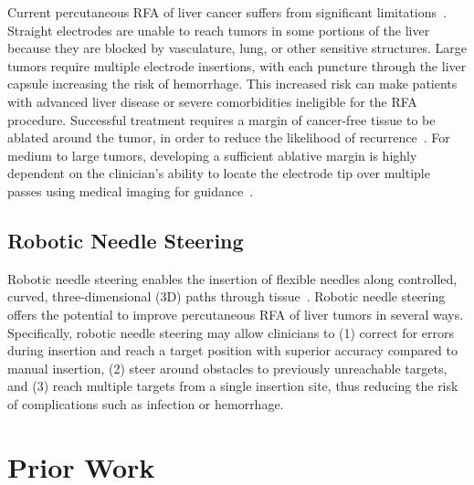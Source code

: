 Current percutaneous RFA of liver cancer suffers from significant limitations~\cite{Gervais2009}. Straight electrodes are unable to reach tumors in some portions of the liver because they are blocked by vasculature, lung, or other sensitive structures. Large tumors require multiple electrode insertions, with each puncture through the liver capsule increasing the risk of hemorrhage. This increased risk can make patients with advanced liver disease or severe comorbidities ineligible for the RFA procedure. Successful treatment requires a margin of cancer-free tissue to be ablated around the tumor, in order to reduce the likelihood of recurrence~\cite{Kim2006}. For medium to large tumors, developing a sufficient ablative margin is highly dependent on the clinician's ability to locate the electrode tip over multiple passes using medical imaging for guidance~\cite{Dodd2001}. 

\subsection{Robotic Needle Steering}
Robotic needle steering enables the insertion of flexible needles along controlled, curved, three-dimensional (3D) paths through tissue~\cite{DiMaio2005,Webster2006}. Robotic needle steering offers the potential to improve percutaneous RFA of liver tumors in several ways. Specifically, robotic needle steering may allow clinicians to (1) correct for errors during insertion and reach a target position with superior accuracy compared to manual insertion, (2) steer around obstacles to previously unreachable targets, and (3) reach multiple targets from a single insertion site, thus reducing the risk of complications such as infection or hemorrhage.

\section{Prior Work}

